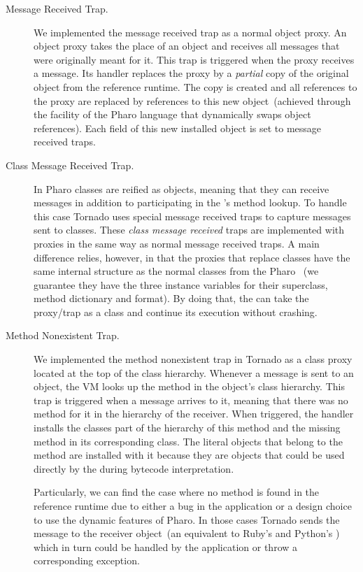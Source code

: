 \begin{description}
\item[Message Received Trap.] We implemented the message received trap as a normal object proxy. An object proxy takes the place of an object and receives all messages that were originally meant for it. This trap is triggered when the proxy receives a message.
Its handler replaces the proxy by a \emph{partial} copy of the original object from the reference runtime.
The copy is created and all references to the proxy are replaced by references to this new object~(achieved through the  facility of the Pharo language that dynamically swaps object references).
Each field of this new installed object is set to message received traps.

\item[Class Message Received Trap.] In Pharo classes are reified as objects, meaning that they can receive messages in addition to participating in the \VM's method lookup. To handle this case Tornado uses special message received traps to capture messages sent to classes. These \emph{class message received} traps are implemented with proxies in the same way as normal message received traps. A main difference relies, however, in that the proxies that replace classes have the same internal structure as the normal classes from the Pharo \VM~(we guarantee they have the three instance variables for their superclass, method dictionary and format). By doing that, the \VM can take the proxy/trap as a class and continue its execution without crashing.

\item[Method Nonexistent Trap.]  We implemented the method nonexistent trap in Tornado as a class proxy located at the top of the class hierarchy. Whenever a message is sent to an object, the VM looks up the method in the object's class hierarchy. This trap is triggered when a message arrives to it, meaning that there was no method for it in the hierarchy of the receiver. When triggered, the handler installs the classes part of the hierarchy of this method and the missing method in its corresponding class. The literal objects that belong to the method are installed with it because they are objects that could be used directly by the \VM during bytecode interpretation.

Particularly, we can find the case where no method is found in the reference runtime due to either a bug in the application or a design choice to use the dynamic features of Pharo. In those cases Tornado sends the  message to the receiver object~(an equivalent to \eg Ruby's  and Python's ) which in turn could be handled by the application or throw a corresponding exception.


\end{description}
